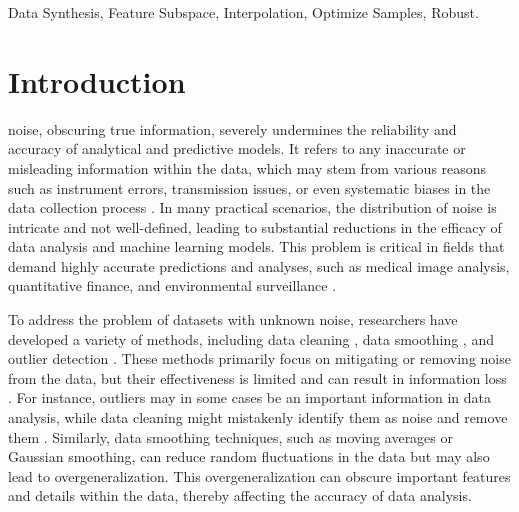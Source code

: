 \documentclass[lettersize,journal]{IEEEtran}
\begin{document}
\begin{IEEEkeywords}
Data Synthesis, Feature Subspace, Interpolation, Optimize Samples, Robust.
\end{IEEEkeywords}


\section{Introduction}
 noise, obscuring true information, severely 
undermines the reliability and accuracy of analytical and predictive 
models. It refers to any inaccurate or misleading 
information within the data, which may stem from various reasons such 
as instrument errors, transmission issues, or even 
systematic biases in the data collection process \cite{bib1,bib2,bib3}. In many practical 
scenarios, the distribution of noise is intricate and not well-defined, 
leading to substantial reductions in the efficacy of data analysis 
and machine learning models. This problem is critical 
in fields that demand highly accurate predictions and analyses, 
such as medical image analysis, quantitative finance, and 
environmental surveillance \cite{bib4,bib5,bib6}.

To address the problem of datasets with unknown noise, researchers 
have developed a variety of methods, including data cleaning \cite{bib7,bib8}, 
data smoothing \cite{bib9,bib10,bib11}, and outlier detection \cite{bib12,bib13}. These methods 
primarily focus on mitigating or removing noise from the data, but 
their effectiveness is limited and can result in information loss \cite{bib14}. 
For instance, outliers may in some cases be an important information 
in data analysis, while data cleaning might mistakenly identify them 
as noise and remove them \cite{bib15}. Similarly, data smoothing techniques, 
such as moving averages or Gaussian smoothing, can reduce random 
fluctuations in the data but may also lead to overgeneralization. 
This overgeneralization can obscure important features and details 
within the data, thereby affecting the accuracy of data analysis. 
\end{document}
